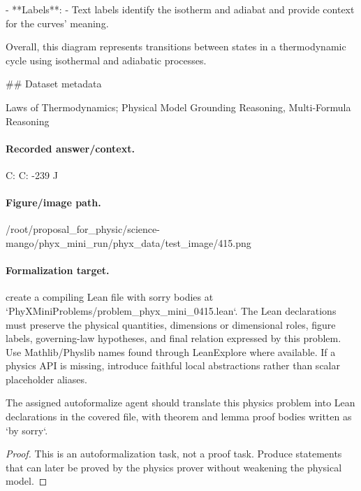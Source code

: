 - **Labels**:
  - Text labels identify the isotherm and adiabat and provide context for the curves' meaning.

Overall, this diagram represents transitions between states in a thermodynamic cycle using isothermal and adiabatic processes.

\#\# Dataset metadata

Laws of Thermodynamics; Physical Model Grounding Reasoning, Multi-Formula Reasoning

\paragraph{Recorded answer/context.}
C: C: -239 J

\paragraph{Figure/image path.}
/root/proposal\_for\_physic/science-mango/phyx\_mini\_run/phyx\_data/test\_image/415.png

\paragraph{Formalization target.}
create a compiling Lean file with sorry bodies at `PhyXMiniProblems/problem\_phyx\_mini\_0415.lean`. The Lean declarations must preserve the physical quantities, dimensions or dimensional roles, figure labels, governing-law hypotheses, and final relation expressed by this problem.
Use Mathlib/Physlib names found through LeanExplore where available. If a physics API is missing, introduce faithful local abstractions rather than scalar placeholder aliases.

\begin{theorem}
\label{thm:physics:phyx_mini_0415:target}
The assigned autoformalize agent should translate this physics problem into Lean declarations in the covered file, with theorem and lemma proof bodies written as `by sorry`.
\end{theorem}
\begin{proof}
This is an autoformalization task, not a proof task. Produce statements that can later be proved by the physics prover without weakening the physical model.
\end{proof}

